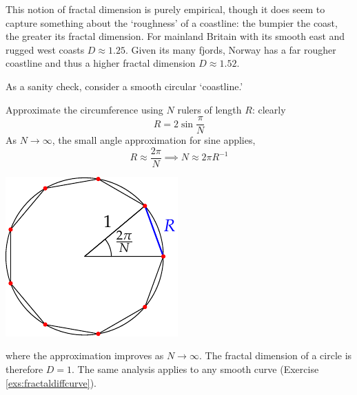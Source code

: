 This notion of fractal dimension is purely empirical, though it does seem to capture something about the `roughness' of a coastline: the bumpier the coast, the greater its fractal dimension. For mainland Britain with its smooth east and rugged west coasts $D\approx 1.25$. Given its many fjords, Norway has a far rougher coastline and thus a higher fractal dimension $D\approx 1.52$.

\begin{example}{}{}
	As a sanity check, consider a smooth circular `coastline.'\par
	\begin{minipage}[t]{0.7\linewidth}\vspace{-8pt}
		Approximate the circumference using $N$ rulers of length $R$: clearly
		\[
			R=2\sin\frac\pi N
		\]
		As $N\to\infty$, the small angle approximation for sine applies,
		\[
			R\approx \frac{2\pi}N\implies N\approx 2\pi R^{-1}
		\]
	\end{minipage}
	\hfill
	\begin{minipage}[t]{0.29\linewidth}\vspace{-15pt}
		\flushright\includegraphics{self-sim-circle}
	\end{minipage}\medbreak
	where the approximation improves as $N\to\infty$. The fractal dimension of a circle is therefore $D=1$. The same analysis applies to any smooth curve (Exercise \ref{exs:fractaldiffcurve}).
\end{example}


\goodbreak


